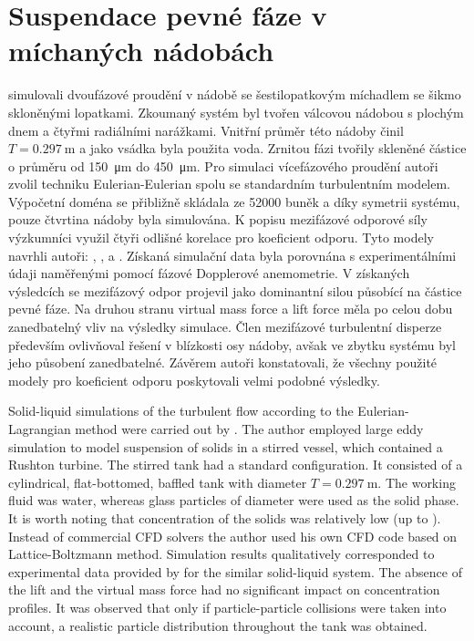 \section{Suspendace pevné fáze v míchaných nádobách}
\citet{lju01} simulovali dvoufázové proudění v nádobě se šestilopatkovým míchadlem se šikmo skloněnými lopatkami. Zkoumaný systém byl tvořen válcovou nádobou s plochým dnem a čtyřmi radiálními narážkami. Vnitřní průměr této nádoby činil $T=\SI{0.297}{\meter}$ a jako vsádka byla použita voda. Zrnitou fázi tvořily skleněné částice o průměru od \SI{150}{\micro\meter} do \SI{450}{\micro\meter}. Pro simulaci vícefázového proudění autoři zvolil techniku Eulerian-Eulerian spolu se standardním \keps{} turbulentním modelem. Výpočetní doména se přibližně skládala ze \num{52000} buněk a díky symetrii systému, pouze čtvrtina nádoby byla simulována. K popisu mezifázové odporové síly výzkumníci využil čtyři odlišné korelace pro koeficient odporu. Tyto modely navrhli autoři: \citet{schi32}, \citet{ish79}, \citet{ihme72} a \citet{bru98}. Získaná simulační data byla porovnána s experimentálními údaji naměřenými pomocí fázové Dopplerové anemometrie. V získaných výsledcích se mezifázový odpor projevil jako dominantní silou působící na částice pevné fáze. Na druhou stranu virtual mass force a lift force měla po celou dobu zanedbatelný vliv na výsledky simulace. Člen mezifázové turbulentní disperze především ovlivňoval řešení v blízkosti osy nádoby, avšak ve zbytku systému byl jeho působení zanedbatelné. Závěrem autoři konstatovali, že všechny použité modely pro koeficient odporu poskytovali velmi podobné výsledky.          

Solid-liquid simulations of the turbulent flow according to the Eulerian-Lagrangian method were carried out by \citet{derk03}. The author employed large eddy simulation to model suspension of solids in a stirred vessel, which contained a Rushton turbine. The stirred tank had a standard configuration. It consisted of a cylindrical, flat-bottomed, baffled tank with diameter $T=\SI{0.297}{\meter}$. The working fluid was water, whereas glass particles of diameter were used as the solid phase. It is worth noting that concentration of the solids was relatively low (up to ). Instead of commercial CFD solvers the author used his own CFD code based on Lattice-Boltzmann method. Simulation results qualitatively corresponded to experimental data provided by \citet{miche03} for the similar solid-liquid system. The absence of the lift and the virtual mass force had no significant impact on concentration profiles. It was observed that only if particle-particle collisions were taken into account, a realistic particle distribution throughout the tank was obtained.



